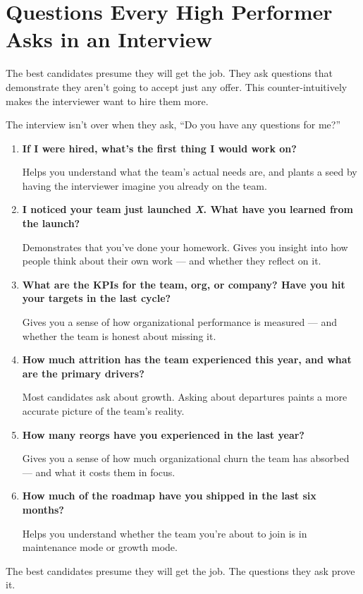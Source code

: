 
\chapter{Questions Every High Performer Asks in an Interview}


The best candidates presume they will get the job. They ask questions
that demonstrate they aren't going to accept just any offer. This
counter-intuitively makes the interviewer want to hire them more.

The interview isn't over when they ask, ``Do you have any questions
for me?''

\vspace{1em}

\begin{enumerate}[leftmargin=2em, itemsep=1.2em]

  \item \textbf{If I were hired, what's the first thing I would work on?}

  Helps you understand what the team's actual needs are, and plants a
  seed by having the interviewer imagine you already on the team.

  \item \textbf{I noticed your team just launched \textit{X}.
  What have you learned from the launch?}

  Demonstrates that you've done your homework. Gives you insight into
  how people think about their own work --- and whether they reflect
  on it.

  \item \textbf{What are the KPIs for the team, org, or company?
  Have you hit your targets in the last cycle?}

  Gives you a sense of how organizational performance is measured ---
  and whether the team is honest about missing it.

  \item \textbf{How much attrition has the team experienced this year,
  and what are the primary drivers?}

  Most candidates ask about growth. Asking about departures paints a
  more accurate picture of the team's reality.

  \item \textbf{How many reorgs have you experienced in the last year?}

  Gives you a sense of how much organizational churn the team has
  absorbed --- and what it costs them in focus.

  \item \textbf{How much of the roadmap have you shipped in the last
  six months?}

  Helps you understand whether the team you're about to join is in
  maintenance mode or growth mode.

\end{enumerate}

\vspace{1.5em}

The best candidates presume they will get the job. The questions they
ask prove it.
